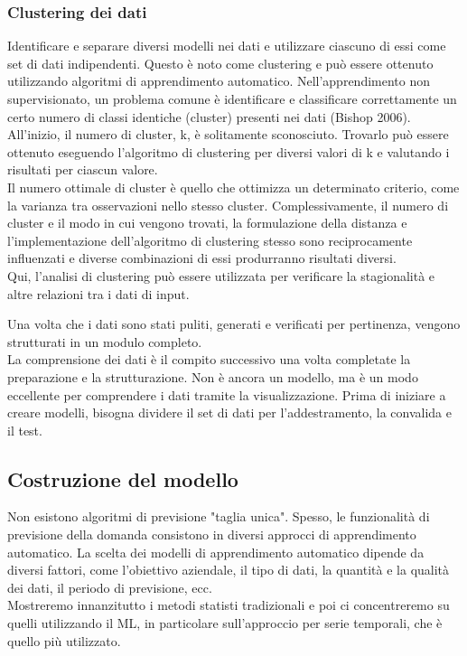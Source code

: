 \documentclass[12pt,a4paper]{report}
\begin{document}
\subsubsection{Clustering dei dati}
Identificare e separare diversi modelli nei dati e utilizzare ciascuno di essi come set di dati indipendenti. Questo è noto come clustering e può essere ottenuto utilizzando algoritmi di apprendimento automatico.
Nell'apprendimento non supervisionato, un problema comune è identificare e classificare correttamente un certo numero di classi identiche (cluster) presenti nei dati (Bishop 2006). All'inizio, il numero di cluster, k, è solitamente sconosciuto. Trovarlo può essere ottenuto eseguendo l'algoritmo di clustering per diversi valori di k e valutando i risultati per ciascun valore.\\
Il numero ottimale di cluster è quello che ottimizza un determinato criterio, come la varianza tra osservazioni nello stesso cluster.
Complessivamente, il numero di cluster e il modo in cui vengono trovati, la formulazione della distanza e l'implementazione dell'algoritmo di clustering stesso sono reciprocamente influenzati e diverse combinazioni di essi produrranno risultati diversi.\\
Qui, l'analisi di clustering può essere utilizzata per verificare la stagionalità e altre relazioni tra i dati di input.

Una volta che i dati sono stati puliti, generati e verificati per pertinenza, vengono strutturati in un modulo completo.\\
La comprensione dei dati è il compito successivo una volta completate la preparazione e la strutturazione. Non è ancora un modello, ma è un modo eccellente per comprendere i dati tramite la visualizzazione. 
Prima di iniziare a creare modelli, bisogna dividere il set di dati per l'addestramento, la convalida e il test.


\subsection{Costruzione del modello}
Non esistono algoritmi di previsione "taglia unica". Spesso, le funzionalità di previsione della domanda consistono in diversi approcci di apprendimento automatico. La scelta dei modelli di apprendimento automatico dipende da diversi fattori, come l'obiettivo aziendale, il tipo di dati, la quantità e la qualità dei dati, il periodo di previsione, ecc.\\
Mostreremo innanzitutto  i metodi statisti tradizionali e poi ci concentreremo su quelli utilizzando il ML, in particolare sull'approccio per serie temporali, che è quello più utilizzato.
\end{document}
